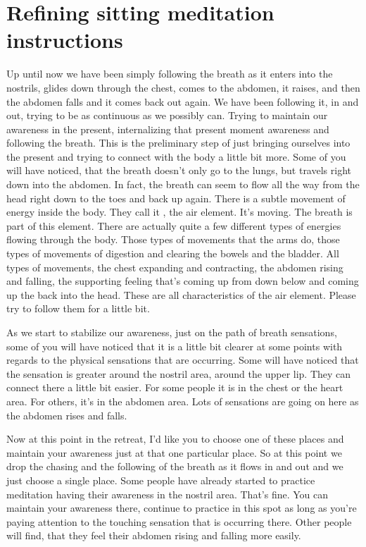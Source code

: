 \documentclass[letterpaper,10pt,english]{sphinxmanual}
\begin{document}
\section{Refining sitting meditation instructions}
\label{\detokenize{2-a:refining-sitting-meditation-instructions}}
\sphinxAtStartPar
Up  until  now  we  have  been  simply  following  the  breath  as  it  enters
into the nostrils, glides down through the chest, comes to the abdomen, it
raises,  and  then  the  abdomen  falls  and  it  comes  back  out  again.  We  have
been following it, in and out, trying to be as continuous as we possibly can.
Trying to maintain our awareness in the present, internalizing that present
moment awareness and following the breath. This is the preliminary step of
just bringing ourselves into the present and trying to connect with the body
a little bit more. Some of you will have noticed, that the breath doesn’t only
go to the lungs, but travels right down into the abdomen. In fact, the breath
can seem to flow all the way from the head right down to the toes and back
  up again. There is a subtle movement of energy inside the body. They call it
, the air element. It’s moving. The breath is part of this element.
There are actually quite a few different types of energies flowing through the
body. Those types of movements that the arms do, those types of movements
of  digestion  and  clearing  the  bowels  and  the  bladder. All  types  of  movements, the chest expanding and contracting, the abdomen rising and falling,
the supporting feeling that’s coming up from down below and coming up the
back into the head. These are all characteristics of the air element. Please try
to follow them for a little bit.

\sphinxAtStartPar
As we start to stabilize our awareness, just on the path of breath sensations, some of you will have noticed that it is a little bit clearer at some
points with regards to the physical sensations that are occurring. Some will
have noticed that the sensation is greater around the nostril area, around the
upper lip. They can connect there a little bit easier. For some people it is in
the chest or the heart area. For others, it’s in the abdomen area. Lots of sensations are going on here as the abdomen rises and falls.

\sphinxAtStartPar
Now  at  this  point  in  the  retreat,  I’d  like  you  to  choose  one  of  these
places and maintain your awareness just at that one particular place. So at
this point we drop the chasing and the following of the breath as it flows in
and out and we just choose a single place. Some people have already started
to practice meditation having their awareness in the nostril area. That’s fine.
You can maintain your awareness there, continue to practice in this spot as
long  as  you’re  paying  attention  to  the  touching  sensation  that  is  occurring
there. Other people will find, that they feel their abdomen rising and falling
more easily.
\end{document}
